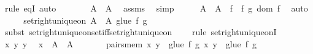 \begin{isabellebody}
\ {\isacharparenleft}{\kern0pt}rule\ eqI{\isacharparenright}{\kern0pt}\ auto\isanewline
\ \ \isamarkupfalse%
\ \isamarkupfalse%
\ {\isachardoublequoteopen}{\isachardot}{\kern0pt}{\isachardot}{\kern0pt}{\isachardot}{\kern0pt}\ {\isacharequal}{\kern0pt}\ A\ {\isasymunion}\ A{\isacharprime}{\kern0pt}{\isachardoublequoteclose}\ \isamarkupfalse%
\ assms\ \isamarkupfalse%
\ simp\isanewline
\ \ \isamarkupfalse%
\ \isamarkupfalse%
\ {\isachardoublequoteopen}A\ {\isasymunion}\ A{\isacharprime}{\kern0pt}\ {\isacharequal}{\kern0pt}\ {\isacharparenleft}{\kern0pt}{\isasymUnion}f\ {\isasymin}\ {\isacharbraceleft}{\kern0pt}f{\isacharcomma}{\kern0pt}\ g{\isacharbraceright}{\kern0pt}{\isachardot}{\kern0pt}\ dom\ f{\isacharparenright}{\kern0pt}{\isachardoublequoteclose}\ \isamarkupfalse%
\ auto\isanewline
\ \ \isamarkupfalse%
\ \isamarkupfalse%
\ {\isachardoublequoteopen}set{\isacharunderscore}{\kern0pt}right{\isacharunderscore}{\kern0pt}unique{\isacharunderscore}{\kern0pt}on\ {\isacharparenleft}{\kern0pt}A\ {\isasymunion}\ A{\isacharprime}{\kern0pt}{\isacharparenright}{\kern0pt}\ {\isacharparenleft}{\kern0pt}glue\ {\isacharbraceleft}{\kern0pt}f{\isacharcomma}{\kern0pt}\ g{\isacharbraceright}{\kern0pt}{\isacharparenright}{\kern0pt}{\isachardoublequoteclose}\isanewline
\ \ \isamarkupfalse%
\ {\isacharparenleft}{\kern0pt}subst\ set{\isacharunderscore}{\kern0pt}right{\isacharunderscore}{\kern0pt}unique{\isacharunderscore}{\kern0pt}on{\isacharunderscore}{\kern0pt}set{\isacharunderscore}{\kern0pt}iff{\isacharunderscore}{\kern0pt}set{\isacharunderscore}{\kern0pt}right{\isacharunderscore}{\kern0pt}unique{\isacharunderscore}{\kern0pt}on{\isacharcomma}{\kern0pt}\isanewline
\ \ \ \ rule\ set{\isacharunderscore}{\kern0pt}right{\isacharunderscore}{\kern0pt}unique{\isacharunderscore}{\kern0pt}onI{\isacharparenright}{\kern0pt}\isanewline
\ \ \ \ \isamarkupfalse%
\ x\ y\ y{\isacharprime}{\kern0pt}\ \isamarkupfalse%
\ {\isachardoublequoteopen}x\ {\isasymin}\ A\ {\isasymunion}\ A{\isacharprime}{\kern0pt}{\isachardoublequoteclose}\isanewline
\ \ \ \ \ \ \ pairs{\isacharunderscore}{\kern0pt}mem{\isacharcolon}{\kern0pt}\ {\isachardoublequoteopen}{\isasymlangle}x{\isacharcomma}{\kern0pt}\ y{\isasymrangle}\ {\isasymin}\ glue\ {\isacharbraceleft}{\kern0pt}f{\isacharcomma}{\kern0pt}\ g{\isacharbraceright}{\kern0pt}{\isachardoublequoteclose}\ {\isachardoublequoteopen}{\isasymlangle}x{\isacharcomma}{\kern0pt}\ y{\isacharprime}{\kern0pt}{\isasymrangle}\ {\isasymin}\ glue\ {\isacharbraceleft}{\kern0pt}f{\isacharcomma}{\kern0pt}\ g{\isacharbraceright}{\kern0pt}{\isachardoublequoteclose}\isanewline

\end{isabellebody}
